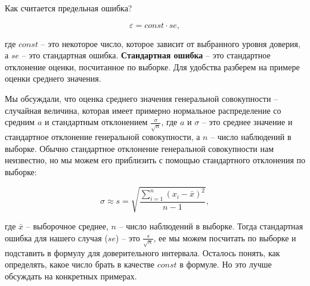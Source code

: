 \documentclass[a4paper,12pt]{extarticle}
\begin{document}
Как считается предельная ошибка?

$$
\varepsilon = const \cdot se, 
$$ 

где $const$ -- это некоторое число, которое зависит от 
выбранного уровня доверия, а $se$ -- это стандартная ошибка. 
\textbf{Стандартная ошибка} -- это стандартное отклонение 
оценки, посчитанное по выборке. Для удобства разберем на 
примере оценки среднего значения.

Мы обсуждали, что оценка среднего значения генеральной 
совокупности -- случайная величина, которая имеет примерно 
нормальное распределение со средним $a$ и стандартным 
отклонением $\frac{\sigma}{\sqrt{n}}$, где $a$ и $\sigma$ -- 
это среднее значение и стандартное отклонение генеральной 
совокупности, а $n$ -- число наблюдений в выборке. Обычно 
стандартное отклонение генеральной совокупности нам 
неизвестно, но мы можем его приблизить с помощью 
стандартного отклонения по выборке:

$$
\sigma \approx s = \sqrt{\frac{\sum\limits_{i=1}^{n}{(x_i-\bar{x})^2}}{n-1}},
$$

где $\bar{x}$ -- выборочное среднее, $n$ -- число наблюдений 
в выборке. Тогда стандартная ошибка для нашего случая ($se$) -- 
это $\frac{s}{\sqrt{n}}$, ее мы можем посчитать по выборке и 
подставить в формулу для доверительного интервала. Осталось 
понять, как определять, какое число брать в качестве $const$ 
в формуле. Но это лучше обсуждать на конкретных примерах.
\end{document}

